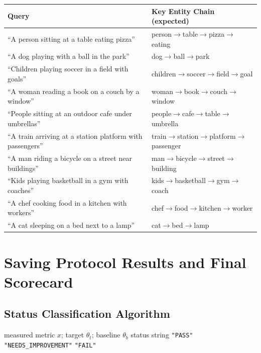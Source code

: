 \documentclass[12pt,a4paper]{article}
\theoremstyle{definition}
\theoremstyle{plain}
\theoremstyle{remark}
\begin{document}
\begin{center}
\renewcommand{\arraystretch}{1.3}
\begin{tabular}{ll}
\toprule
\textbf{Query} & \textbf{Key Entity Chain (expected)} \\
\midrule
``A person sitting at a table eating pizza''             &
  person$\to$table$\to$pizza$\to$eating \\
``A dog playing with a ball in the park''                &
  dog$\to$ball$\to$park \\
``Children playing soccer in a field with goals''        &
  children$\to$soccer$\to$field$\to$goal \\
``A woman reading a book on a couch by a window''        &
  woman$\to$book$\to$couch$\to$window \\
``People sitting at an outdoor cafe under umbrellas''    &
  people$\to$cafe$\to$table$\to$umbrella \\
``A train arriving at a station platform with passengers'' &
  train$\to$station$\to$platform$\to$passenger \\
``A man riding a bicycle on a street near buildings''    &
  man$\to$bicycle$\to$street$\to$building \\
``Kids playing basketball in a gym with coaches''        &
  kids$\to$basketball$\to$gym$\to$coach \\
``A chef cooking food in a kitchen with workers''        &
  chef$\to$food$\to$kitchen$\to$worker \\
``A cat sleeping on a bed next to a lamp''               &
  cat$\to$bed$\to$lamp \\
\bottomrule
\end{tabular}
\end{center}

\newpage
\section{Saving Protocol Results and Final Scorecard}

\subsection{Status Classification Algorithm}

\begin{algorithm}[H]
\caption{\textsc{ClassifyStatus}$(x,\; \theta_t,\; \theta_b)$}
\label{alg:status}
\begin{algorithmic}[1]
\Require measured metric $x$; target $\theta_t$; baseline $\theta_b$
\Ensure status string
  \State \Return \texttt{"PASS"}
  \State \Return \texttt{"NEEDS\_IMPROVEMENT"}
\Else
  \State \Return \texttt{"FAIL"}
\EndIf
\end{algorithmic}
\end{algorithm}
\end{document}
